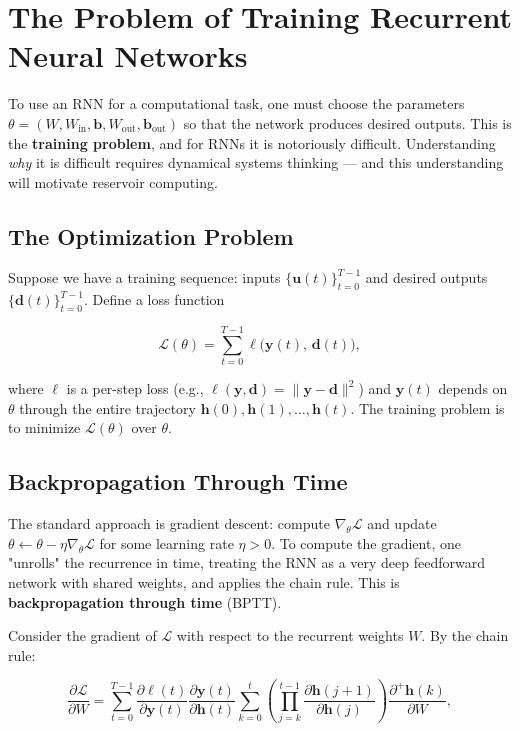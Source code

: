 \bigskip


\section{The Problem of Training Recurrent Neural Networks}\label{sec:13.3}

To use an RNN for a computational task, one must choose the parameters $\theta = (W, W_{\text{in}}, \mathbf{b}, W_{\text{out}}, \mathbf{b}_{\text{out}})$ so that the network produces desired outputs. This is the \textbf{training problem}, and for RNNs it is notoriously difficult. Understanding \textit{why} it is difficult requires dynamical systems thinking --- and this understanding will motivate reservoir computing.

\subsection{The Optimization Problem}\label{sec:13.3.1}

Suppose we have a training sequence: inputs $\{\mathbf{u}(t)\}_{t=0}^{T-1}$ and desired outputs $\{\mathbf{d}(t)\}_{t=0}^{T-1}$. Define a loss function

\[
\mathcal{L}(\theta) = \sum_{t=0}^{T-1} \ell\!\big(\mathbf{y}(t),\, \mathbf{d}(t)\big),
\]

where $\ell$ is a per-step loss (e.g., $\ell(\mathbf{y}, \mathbf{d}) = \|\mathbf{y} - \mathbf{d}\|^2$) and $\mathbf{y}(t)$ depends on $\theta$ through the entire trajectory $\mathbf{h}(0), \mathbf{h}(1), \ldots, \mathbf{h}(t)$. The training problem is to minimize $\mathcal{L}(\theta)$ over $\theta$.

\subsection{Backpropagation Through Time}\label{sec:13.3.2}

The standard approach is gradient descent: compute $\nabla_\theta \mathcal{L}$ and update $\theta \leftarrow \theta - \eta \nabla_\theta \mathcal{L}$ for some learning rate $\eta > 0$. To compute the gradient, one "unrolls" the recurrence in time, treating the RNN as a very deep feedforward network with shared weights, and applies the chain rule. This is \textbf{backpropagation through time} (BPTT).

Consider the gradient of $\mathcal{L}$ with respect to the recurrent weights $W$. By the chain rule:

\[
\frac{\partial \mathcal{L}}{\partial W} = \sum_{t=0}^{T-1} \frac{\partial \ell(t)}{\partial \mathbf{y}(t)} \frac{\partial \mathbf{y}(t)}{\partial \mathbf{h}(t)} \sum_{k=0}^{t} \left(\prod_{j=k}^{t-1} \frac{\partial \mathbf{h}(j+1)}{\partial \mathbf{h}(j)}\right) \frac{\partial^+ \mathbf{h}(k)}{\partial W},
\]

